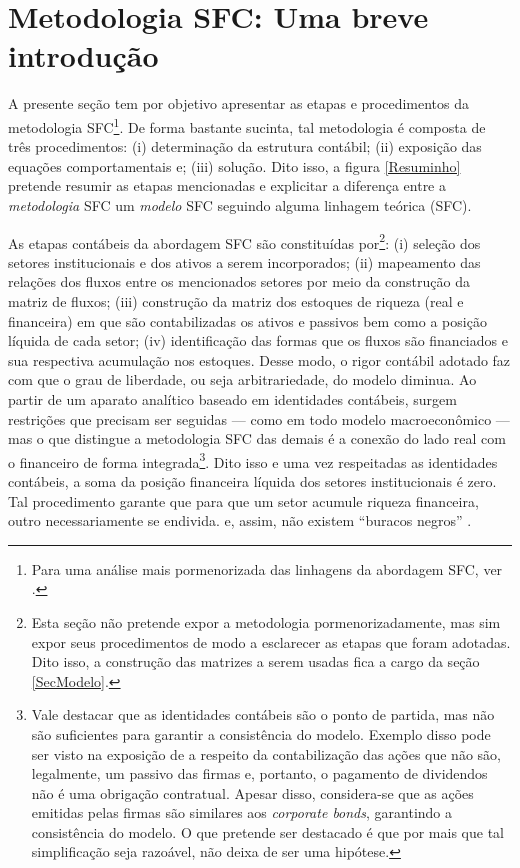 \section{Metodologia SFC: Uma breve introdução}
\label{IntroSFC}


A presente seção tem por objetivo apresentar as etapas e procedimentos da metodologia  SFC\footnote{Para uma análise mais pormenorizada das linhagens da abordagem SFC, ver \textcite{caverzasi_stock-flow_2013}.}. De forma bastante sucinta, tal metodologia é composta de três procedimentos: (i) determinação da estrutura contábil; (ii) exposição das equações comportamentais e; (iii) solução. Dito isso, a figura \ref{Resuminho} pretende resumir as etapas mencionadas e explicitar a diferença entre a \textit{metodologia} SFC um \textit{modelo} SFC seguindo alguma linhagem teórica (SFC). 



As etapas contábeis da abordagem SFC são constituídas por\footnote{Esta seção não pretende expor a metodologia pormenorizadamente, mas sim expor seus procedimentos de modo a esclarecer as etapas que foram adotadas. Dito isso, a construção das matrizes a serem usadas fica a cargo da seção \ref{SecModelo}.}: (i) seleção dos setores institucionais e dos ativos a serem incorporados; (ii) mapeamento das relações dos fluxos entre os mencionados setores por meio da construção da matriz de fluxos; (iii) construção da matriz dos estoques de riqueza (real e financeira) em que são contabilizadas os ativos e passivos  bem como a posição líquida de cada setor; (iv) identificação das formas que os fluxos são financiados e sua respectiva acumulação nos estoques. Desse modo, o rigor contábil adotado faz com que o grau de liberdade, ou seja arbitrariedade, do modelo diminua. 
Ao partir de um aparato analítico baseado em identidades contábeis, surgem restrições que precisam ser seguidas  --- como em todo modelo macroeconômico --- mas o que distingue a metodologia SFC das demais é a conexão do lado real com o financeiro de forma integrada\footnote{Vale destacar que as identidades contábeis são o ponto de partida, mas não são suficientes para garantir a consistência do modelo. Exemplo disso pode ser visto na exposição de  \textcite[p.~27--8]{godley_monetary_2007}  a respeito da contabilização das ações que não são, legalmente, um passivo das firmas e, portanto, o pagamento de dividendos não é uma obrigação contratual. Apesar disso, considera-se que as ações emitidas pelas firmas são similares aos \textit{corporate bonds}, garantindo a consistência do modelo. O que pretende ser destacado é que por mais que tal simplificação seja razoável, não deixa de ser uma hipótese.}. 
Dito isso e uma vez respeitadas as identidades contábeis, a soma da posição financeira líquida dos setores institucionais é zero. Tal procedimento garante que para que um setor acumule riqueza financeira, outro necessariamente se endivida. e, assim, não existem ``buracos negros'' \cite{godley_money_1996}. 


